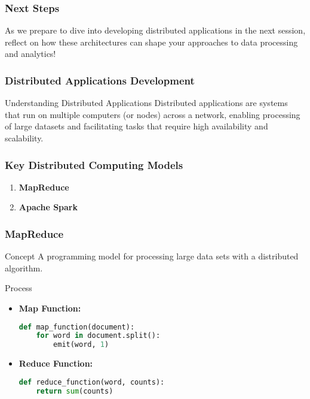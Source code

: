 \documentclass[aspectratio=169]{beamer}
\begin{document}
\begin{frame}[fragile]
    \frametitle{Next Steps}
    As we prepare to dive into developing distributed applications in the next session, reflect on how these architectures can shape your approaches to data processing and analytics!
\end{frame}

\begin{frame}[fragile]
    \frametitle{Distributed Applications Development}
    
    \begin{block}{Understanding Distributed Applications}
        Distributed applications are systems that run on multiple computers (or nodes) across a network, enabling processing of large datasets and facilitating tasks that require high availability and scalability.
    \end{block}
\end{frame}

\begin{frame}[fragile]
    \frametitle{Key Distributed Computing Models}

    \begin{enumerate}
        \item \textbf{MapReduce}
        \item \textbf{Apache Spark}
    \end{enumerate}
\end{frame}

\begin{frame}[fragile]
    \frametitle{MapReduce}

    \begin{block}{Concept}
        A programming model for processing large data sets with a distributed algorithm.
    \end{block}
    
    \begin{block}{Process}
        \begin{itemize}
            \item \textbf{Map Function:}
            \begin{lstlisting}[language=Python]
def map_function(document):
    for word in document.split():
        emit(word, 1)
            \end{lstlisting}
            \item \textbf{Reduce Function:}
            \begin{lstlisting}[language=Python]
def reduce_function(word, counts):
    return sum(counts)
            \end{lstlisting}
        \end{itemize}
    \end{block}
\end{frame}
\end{document}
